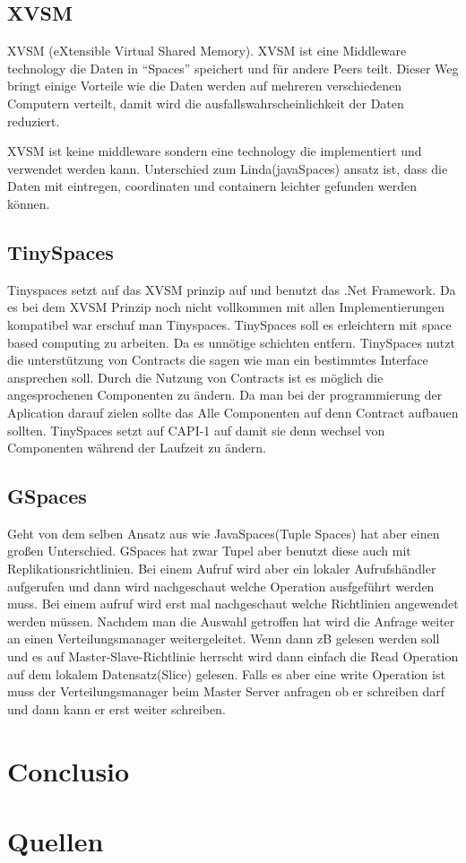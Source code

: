 \documentclass[a4paper,12pt]{scrreprt}
\begin{document}
		\section{XVSM}
		XVSM (eXtensible Virtual Shared Memory). XVSM ist eine Middleware technology die Daten in “Spaces” speichert  und für andere Peers teilt. Dieser Weg bringt einige Vorteile wie die Daten werden auf mehreren verschiedenen Computern verteilt, damit wird die ausfallswahrscheinlichkeit der Daten reduziert.
		
		XVSM ist keine middleware sondern eine technology die implementiert und verwendet werden kann.
		Unterschied zum Linda(javaSpaces) ansatz ist, dass die Daten mit eintregen, coordinaten und containern leichter gefunden werden können.
		
		
		\section{TinySpaces}
			Tinyspaces setzt auf das XVSM prinzip auf und benutzt das .Net Framework. Da es bei dem XVSM Prinzip noch nicht vollkommen mit allen Implementierungen kompatibel war erschuf man Tinyspaces. 
			TinySpaces soll es erleichtern mit space based computing zu arbeiten. Da es unnötige schichten entfern. 
			TinySpaces nutzt die unterstützung von Contracts die sagen wie man ein bestimmtes Interface ansprechen soll.
			Durch die Nutzung von Contracts ist es möglich die angesprochenen Componenten zu ändern. Da man bei der programmierung der Aplication darauf zielen sollte das Alle Componenten auf denn Contract aufbauen sollten.
			TinySpaces setzt auf CAPI-1 auf damit sie denn wechsel von Componenten während der Laufzeit zu ändern.
		\section{GSpaces}
		Geht von dem selben Ansatz aus wie JavaSpaces(Tuple Spaces) hat aber einen großen Unterschied. GSpaces hat zwar Tupel aber benutzt diese auch mit Replikationsrichtlinien.  Bei einem Aufruf wird aber ein lokaler Aufrufshändler aufgerufen und dann wird nachgeschaut welche Operation ausfgeführt werden muss. Bei  einem aufruf wird erst mal nachgeschaut welche Richtlinien angewendet werden müssen. Nachdem man die Auswahl getroffen hat wird die Anfrage weiter an einen Verteilungsmanager weitergeleitet.  Wenn dann zB gelesen werden soll und es auf Master-Slave-Richtlinie herrscht wird dann einfach die Read Operation auf dem lokalem Datensatz(Slice) gelesen. Falls es aber eine write Operation ist muss der Verteilungsmanager beim Master Server anfragen ob er schreiben darf und dann kann er erst weiter schreiben.	
	
\chapter{Conclusio}

\chapter{Quellen}
\end{document}
